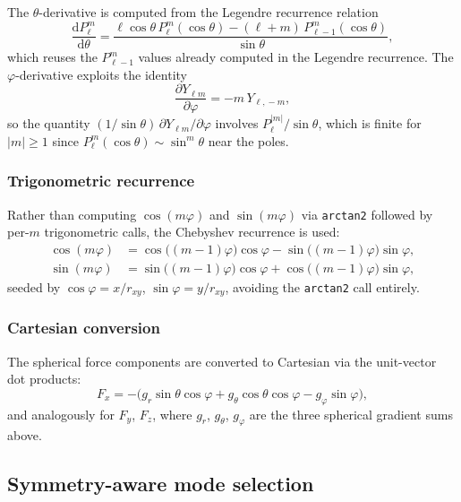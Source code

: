 \documentclass[11pt]{article}
\begin{document}
The $\theta$-derivative is computed from the Legendre recurrence relation
\begin{equation}
  \frac{\mathrm{d}P_\ell^m}{\mathrm{d}\theta}
  = \frac{\ell\cos\theta\, P_\ell^m(\cos\theta) - (\ell+m)\, P_{\ell-1}^m(\cos\theta)}
         {\sin\theta},
\end{equation}
which reuses the $P_{\ell-1}^m$ values already computed in the Legendre
recurrence.  The $\varphi$-derivative exploits the identity
\begin{equation}
  \frac{\partial Y_{\ell m}}{\partial\varphi} = -m\, Y_{\ell,\!-m},
\end{equation}
so the quantity $(1/\sin\theta)\,\partial Y_{\ell m}/\partial\varphi$ involves
$P_\ell^{|m|}/\sin\theta$, which is finite for $|m|\geq 1$ since
$P_\ell^m(\cos\theta) \sim \sin^m\!\theta$ near the poles.

\subsubsection{Trigonometric recurrence}

Rather than computing $\cos(m\varphi)$ and $\sin(m\varphi)$ via
\texttt{arctan2} followed by per-$m$ trigonometric calls, the Chebyshev
recurrence is used:
\begin{align}
  \cos(m\varphi) &= \cos\bigl((m{-}1)\varphi\bigr)\cos\varphi
                   - \sin\bigl((m{-}1)\varphi\bigr)\sin\varphi, \\
  \sin(m\varphi) &= \sin\bigl((m{-}1)\varphi\bigr)\cos\varphi
                   + \cos\bigl((m{-}1)\varphi\bigr)\sin\varphi,
\end{align}
seeded by $\cos\varphi = x/r_{xy}$, $\sin\varphi = y/r_{xy}$, avoiding
the \texttt{arctan2} call entirely.

\subsubsection{Cartesian conversion}

The spherical force components are converted to Cartesian via the
unit-vector dot products:
\begin{equation}
  F_x = -\bigl(g_r\sin\theta\cos\varphi + g_\theta\cos\theta\cos\varphi
        - g_\varphi\sin\varphi\bigr),
\end{equation}
and analogously for $F_y$, $F_z$, where $g_r$, $g_\theta$, $g_\varphi$ are
the three spherical gradient sums above.

\subsection{Symmetry-aware mode selection}
\label{sec:symmetry}
\end{document}
